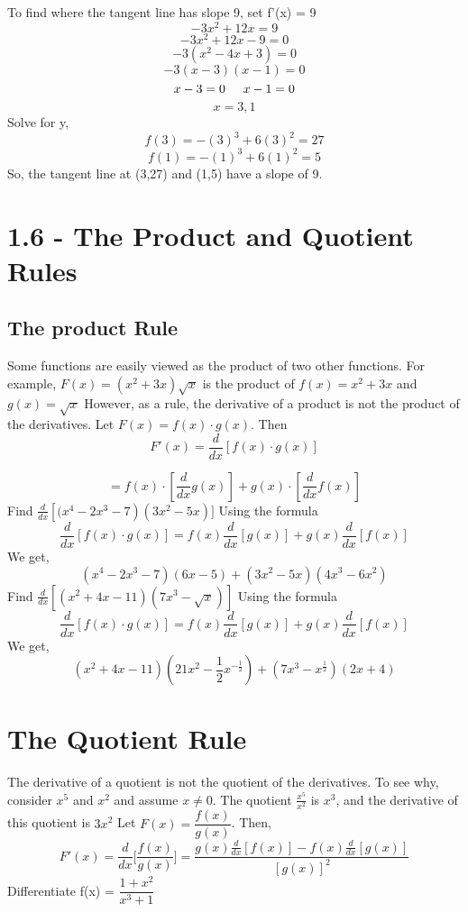 \documentclass{report}
\begin{document}
To find where the tangent line has slope 9, set f'(x) = 9
$$ -3x^2 +12x = 9$$
$$ -3x^2 + 12x - 9 = 0$$
$$ -3(x^2 - 4x + 3) = 0$$
$$ -3(x-3)(x-1) = 0$$
$$ x - 3 = 0 \hspace{5mm} x -1 =0$$
$$ x=3,1$$
Solve for y,
$$ f(3) = -(3)^3 + 6(3)^2 = 27$$
$$ f(1) = -(1)^3 + 6(1)^2 = 5$$
\bigbreak \noindent
So, the tangent line at (3,27) and (1,5) have a slope of 9.
\pagebreak
\section{1.6 - The Product and Quotient Rules}
\subsection*{The product Rule}
Some functions are easily viewed as the product of two other functions. For example, $F(x) = (x^2 + 3x)\sqrt{x}$ is the product of $f(x) = x^2 +3x$ and $g(x) = \sqrt{x}$ However, as a rule, the derivative of a product is not the product of the derivatives.
\bigbreak \noindent \bigbreak \noindent
Let $F(x) = f(x) \cdot g(x)$. Then
$$ F'(x) = \frac{d}{dx}\left[f(x) \cdot g(x)\right]$$

$$ = f(x) \cdot \left[\frac{d}{dx}g(x) \right] + g(x) \cdot \left[\frac{d}{dx}f(x)\right]$$
\bigbreak \noindent
\q
Find  $ \frac{d}{dx}\left[(x^4 - 2x^3 - 7\right)\left(3x^2-5x\right)]$
\bigbreak \noindent \bigbreak \noindent
Using the formula 
$$\frac{d}{dx}[f(x) \cdot g(x)] = f(x) \frac{d}{dx}[g(x)] + g(x) \frac{d}{dx}[f(x)]$$
\bigbreak \noindent
We get,
$$(x^4 -2x^3 - 7)(6x-5) + (3x^2 - 5x)(4x^3 - 6x^2)$$
\bigbreak \noindent \bigbreak \noindent
\q
\bigbreak \noindent
Find $ \frac{d}{dx}\left[(x^2+4x-11)(7x^3 - \sqrt{x})\right]$
Using the formula
$$ \frac{d}{dx}[f(x) \cdot g(x)] = f(x) \frac{d}{dx}[g(x)] + g(x) \frac{d}{dx}[f(x)]$$
\bigbreak \noindent
We get,
$$\left(x^2 + 4x -11\right)\left(21x^2 - \frac{1}{2}x^{-\frac{1}{2}}\right) + \left(7x^3 - x^{\frac{1}{2}}\right)\left(2x+4\right)$$
\bigbreak \noindent \bigbreak \noindent
\section*{The Quotient Rule}
The derivative of a quotient is not the quotient of the derivatives. To see why, consider $x^5$ and $x^2$ and assume $x\neq 0$. The quotient $\frac{x^5}{x^2}$ is $x^3$, and the derivative of this quotient is $3x^2$
\bigbreak \noindent
Let $F(x) = \dfrac{f(x)}{g(x)}$.
\bigbreak \noindent
Then,
$$ F'(x) = \frac{d}{dx}\bigg[ \frac{f(x)}{g(x)}\bigg] = \frac{g(x) \frac{d}{dx}[f(x)] - f(x) \frac{d}{dx}[g(x)]}{[g(x)]^2}$$
\pagebreak
\q
\bigbreak \noindent
Differentiate f(x) = $\dfrac{1 + x^2}{x^3 + 1}$
\end{document}
